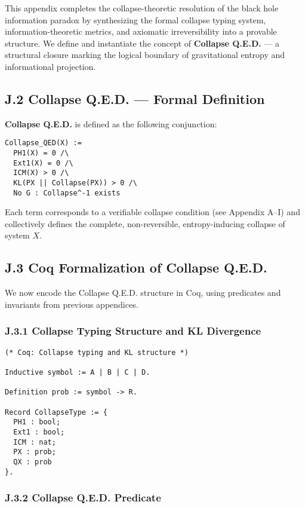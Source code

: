 \documentclass[11pt]{article}
\begin{document}
This appendix completes the collapse-theoretic resolution of the black hole information paradox by synthesizing the formal collapse typing system, information-theoretic metrics, and axiomatic irreversibility into a provable structure. We define and instantiate the concept of \textbf{Collapse Q.E.D.} — a structural closure marking the logical boundary of gravitational entropy and informational projection.

\subsection*{J.2 Collapse Q.E.D. — Formal Definition}

\textbf{Collapse Q.E.D.} is defined as the following conjunction:

\begin{lstlisting}
Collapse_QED(X) :=
  PH1(X) = 0 /\
  Ext1(X) = 0 /\
  ICM(X) > 0 /\
  KL(PX || Collapse(PX)) > 0 /\
  No G : Collapse^-1 exists
\end{lstlisting}

Each term corresponds to a verifiable collapse condition (see Appendix A–I) and collectively defines the complete, non-reversible, entropy-inducing collapse of system \( X \).

\subsection*{J.3 Coq Formalization of Collapse Q.E.D.}

We now encode the Collapse Q.E.D. structure in Coq, using predicates and invariants from previous appendices.

\subsubsection*{J.3.1 Collapse Typing Structure and KL Divergence}

\begin{lstlisting}
(* Coq: Collapse typing and KL structure *)

Inductive symbol := A | B | C | D.

Definition prob := symbol -> R.

Record CollapseType := {
  PH1 : bool;
  Ext1 : bool;
  ICM : nat;
  PX : prob;
  QX : prob
}.
\end{lstlisting}

\subsubsection*{J.3.2 Collapse Q.E.D. Predicate}
\end{document}
